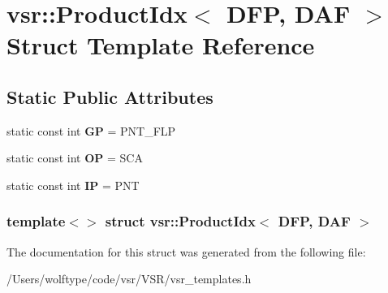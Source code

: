 \hypertarget{structvsr_1_1_product_idx_3_01_d_f_p_00_01_d_a_f_01_4}{\section{vsr\-:\-:Product\-Idx$<$ D\-F\-P, D\-A\-F $>$ Struct Template Reference}
\label{structvsr_1_1_product_idx_3_01_d_f_p_00_01_d_a_f_01_4}
}
\subsection*{Static Public Attributes}
\begin{DoxyCompactItemize}
\item 
\hypertarget{structvsr_1_1_product_idx_3_01_d_f_p_00_01_d_a_f_01_4_a0829ec74a6452a922704e4136ee7ef6d}{static const int {\bfseries G\-P} = P\-N\-T\-\_\-\-F\-L\-P}\label{structvsr_1_1_product_idx_3_01_d_f_p_00_01_d_a_f_01_4_a0829ec74a6452a922704e4136ee7ef6d}

\item 
\hypertarget{structvsr_1_1_product_idx_3_01_d_f_p_00_01_d_a_f_01_4_af8a13b28fcea209b26637a46b330c660}{static const int {\bfseries O\-P} = S\-C\-A}\label{structvsr_1_1_product_idx_3_01_d_f_p_00_01_d_a_f_01_4_af8a13b28fcea209b26637a46b330c660}

\item 
\hypertarget{structvsr_1_1_product_idx_3_01_d_f_p_00_01_d_a_f_01_4_a0fbca94566791341c19af23f6887eb88}{static const int {\bfseries I\-P} = P\-N\-T}\label{structvsr_1_1_product_idx_3_01_d_f_p_00_01_d_a_f_01_4_a0fbca94566791341c19af23f6887eb88}

\end{DoxyCompactItemize}
\subsubsection*{template$<$$>$ struct vsr\-::\-Product\-Idx$<$ D\-F\-P, D\-A\-F $>$}



The documentation for this struct was generated from the following file\-:\begin{DoxyCompactItemize}
\item 
/\-Users/wolftype/code/vsr/\-V\-S\-R/vsr\-\_\-templates.\-h\end{DoxyCompactItemize}
